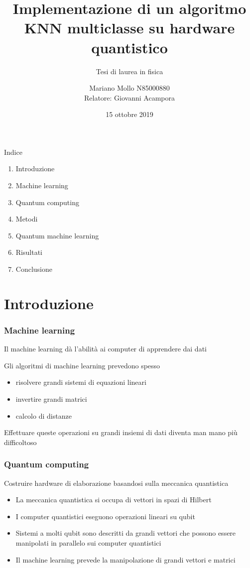 \documentclass{beamer}
\title{Implementazione di un algoritmo KNN multiclasse su hardware quantistico}
\subtitle{Tesi di laurea in fisica}
\author{Mariano Mollo N85000880\texorpdfstring{\\}{,} Relatore: Giovanni Acampora}
\institute{Università degli Studi di Napoli Federico II}
\date{15 ottobre 2019}
\begin{document}
	\begin{frame}
		\maketitle
	\end{frame}

	\begin{frame}{Indice}
		\begin{enumerate}
			\item Introduzione
			\item Machine learning
			\item Quantum computing
			\item Metodi
			\item Quantum machine learning
			\item Risultati
			\item Conclusione
		\end{enumerate}
	\end{frame}

	\section{Introduzione}

	\begin{frame}
		\frametitle{Machine learning}
	
		Il machine learning dà l'abilità ai computer di apprendere dai dati

		Gli algoritmi di machine learning prevedono spesso

		\begin{itemize}
			\item risolvere grandi sistemi di equazioni lineari
			\item invertire grandi matrici
			\item calcolo di distanze
		\end{itemize}
	
		Effettuare queste operazioni su grandi insiemi di dati diventa 
		man mano più difficoltoso
	\end{frame}

	\begin{frame}
		\frametitle{Quantum computing}
	
		Costruire hardware di elaborazione basandosi sulla meccanica quantistica

		\begin{itemize}
			\item La meccanica quantistica si occupa di vettori in spazi di Hilbert
			\item I computer quantistici eseguono operazioni lineari su qubit
			\item Sistemi a molti qubit sono descritti da grandi vettori che possono 
			essere manipolati in parallelo sui computer quantistici 
			\item Il machine learning prevede la manipolazione di grandi vettori e matrici
		\end{itemize}
	
	\end{frame}
\end{document}
